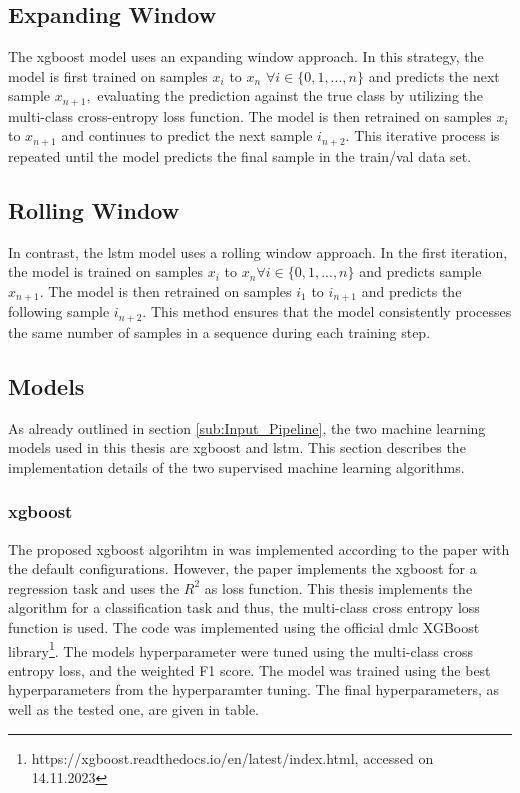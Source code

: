 \subsection{Expanding Window}
\label{sub:Expanding_Window}
The \gls{xgboost} model uses an expanding window approach. In this strategy, the model is first trained on samples $x_i$ to $x_n$ $\forall i \in \{0, 1, ..., n\}$ and predicts the next sample $x_{n+1},$ evaluating the prediction against the true class by utilizing the multi-class cross-entropy loss function. The model is then retrained on samples $x_i$ to $x_{n+1}$ and continues to predict the next sample $i_{n+2}.$ This iterative process is repeated until the model predicts the final sample in the train/val data set.

\subsection{Rolling Window}
\label{sub:Rolling_Window}
In contrast, the \gls{lstm} model uses a rolling window approach. In the first iteration, the model is trained on samples $x_i$ to $x_n \forall i \in \{0, 1, ..., n\}$ and predicts sample $x_{n+1}.$ The model is then retrained on samples $i_1$ to $i_{n+1}$ and predicts the following sample $i_{n+2}.$ This method ensures that the model consistently processes the same number of samples in a sequence during each training step.

\subsection{Models}
\label{sec:Models}
As already outlined in section \ref{sub:Input_Pipeline}, the two machine learning models used in this thesis are \gls{xgboost} and \gls{lstm}. This section describes the implementation details of the two supervised machine learning algorithms.

\subsubsection{\gls{xgboost}}
\label{subsub:XGBoost_train}
The proposed \gls{xgboost} algorihtm in \cite{liu2023forecasting} was implemented according to the paper with the default configurations. However, the paper implements the \gls{xgboost} for a regression task and uses the $R^2$ as loss function. This thesis implements the algorithm for a classification task and thus, the multi-class cross entropy loss function is used. The code was implemented using the official dmlc XGBoost library\footnote{https://xgboost.readthedocs.io/en/latest/index.html, accessed on 14.11.2023}. The models hyperparameter were tuned using the multi-class cross entropy loss, and the weighted F1 score. The model was trained using the best hyperparameters from the hyperparamter tuning. The final hyperparameters, as well as the tested one, are given in table.

